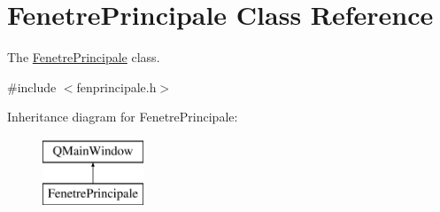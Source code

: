 \hypertarget{class_fenetre_principale}{}\section{Fenetre\+Principale Class Reference}
\label{class_fenetre_principale}


The \hyperlink{class_fenetre_principale}{Fenetre\+Principale} class.  




{\ttfamily \#include $<$fenprincipale.\+h$>$}

Inheritance diagram for Fenetre\+Principale\+:\begin{figure}[H]
\begin{center}
\leavevmode
\includegraphics[height=2.000000cm]{class_fenetre_principale}
\end{center}
\end{figure}
